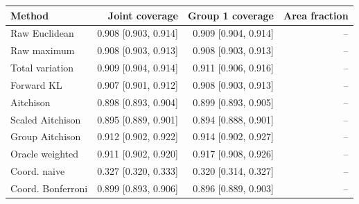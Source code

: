 \begin{tabular}{lrrr}
\toprule
Method & Joint coverage & Group 1 coverage & Area fraction \\
\midrule
Raw Euclidean & 0.908 [0.903, 0.914] & 0.909 [0.904, 0.914] & -- \\
Raw maximum & 0.908 [0.903, 0.913] & 0.908 [0.903, 0.913] & -- \\
Total variation & 0.909 [0.904, 0.914] & 0.911 [0.906, 0.916] & -- \\
Forward KL & 0.907 [0.901, 0.912] & 0.908 [0.903, 0.913] & -- \\
Aitchison & 0.898 [0.893, 0.904] & 0.899 [0.893, 0.905] & -- \\
Scaled Aitchison & 0.895 [0.889, 0.901] & 0.894 [0.888, 0.901] & -- \\
Group Aitchison & 0.912 [0.902, 0.922] & 0.914 [0.902, 0.927] & -- \\
Oracle weighted & 0.911 [0.902, 0.920] & 0.917 [0.908, 0.926] & -- \\
Coord. naive & 0.327 [0.320, 0.333] & 0.320 [0.314, 0.327] & -- \\
Coord. Bonferroni & 0.899 [0.893, 0.906] & 0.896 [0.889, 0.903] & -- \\
\bottomrule
\end{tabular}

